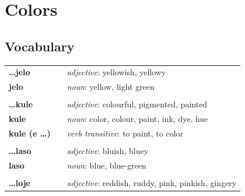 \section{Colors}
%
\subsection*{Vocabulary}
%
\begin{supertabular}{p{2,5cm}|ll}
    \textbf{\dots jelo}        &  & \textit{adjective}: yellowish, yellowy                                \\ %
    \textbf{jelo}              &  & \textit{noun}: yellow, light green                                    \\ %
                               &  &                                                                       \\ %
    \textbf{\dots kule}        &  & \textit{adjective}: colourful, pigmented, painted                     \\ %
    \textbf{kule}              &  & \textit{noun}: color, colour, paint, ink, dye, hue                    \\ %
    \textbf{kule (e \dots)}    &  & \textit{verb transitive}: to paint, to color                          \\ %
                               &  &                                                                       \\ %
    \textbf{\dots laso}        &  & \textit{adjective}: bluish, bluey                                     \\ %
    \textbf{laso}              &  & \textit{noun}: blue, blue-green                                       \\ %
                               &  &                                                                       \\ %
    \textbf{\dots loje}        &  & \textit{adjective}: reddish, ruddy, pink, pinkish, gingery            \\ %

\end{supertabular}
